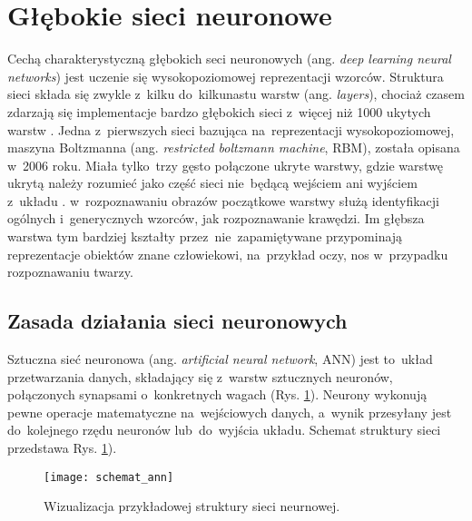 \section{Głębokie sieci neuronowe}

Cechą charakterystyczną głębokich seci neuronowych (ang. \textit{deep learning neural networks}) jest uczenie się wysokopoziomowej reprezentacji wzorców. Struktura sieci składa się zwykle z~kilku do~kilkunastu warstw (ang. \textit{layers}), chociaż czasem zdarzają się implementacje bardzo głębokich sieci z~więcej niż 1000 ukytych warstw \cite{He2015DeepRL}. Jedna z~pierwszych sieci bazująca na~reprezentacji wysokopoziomowej, maszyna Boltzmanna (ang. \textit{restricted boltzmann machine}, RBM), została opisana w~2006 roku. Miała tylko~trzy gęsto połączone ukryte warstwy, gdzie warstwę ukrytą należy rozumieć jako część sieci nie~będącą wejściem ani wyjściem z~układu \cite{Hinton2006AFL}. w~rozpoznawaniu obrazów początkowe warstwy służą identyfikacji ogólnych i~generycznych wzorców, jak rozpoznawanie krawędzi. Im głębsza warstwa tym bardziej kształty przez~nie~zapamiętywane przypominają reprezentacje obiektów znane człowiekowi, na~przykład oczy, nos w~przypadku rozpoznawaniu twarzy.

\subsection{Zasada działania sieci neuronowych}
Sztuczna sieć neuronowa (ang. \textit{artificial neural network}, ANN) jest to~układ przetwarzania danych, składający się z~warstw sztucznych neuronów, połączonych synapsami o~konkretnych wagach (Rys. \ref{fig:ann_visualisation}). Neurony wykonują pewne operacje matematyczne na~wejściowych danych, a~wynik przesyłany jest do~kolejnego rzędu neuronów lub~do~wyjścia układu. Schemat struktury sieci przedstawa Rys. \ref{fig:ann_visualisation}).

\begin{figure}[h!]
	\centering
	\centering
		\texttt{[image: schemat\_ann]}	
	\caption{Wizualizacja przykładowej struktury sieci neurnowej.}
	\label{fig:ann_visualisation}
\end{figure}

